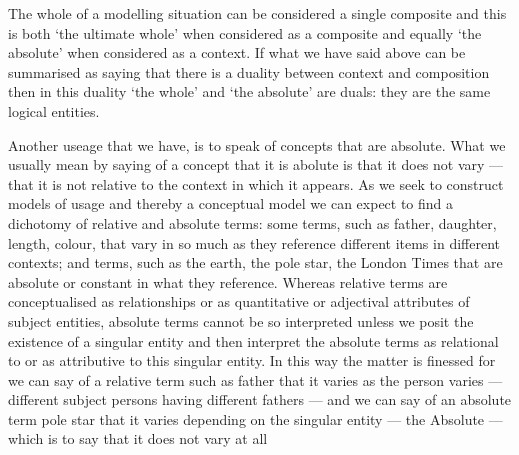 The whole of a modelling situation can be considered a single composite and this is both ‘the ultimate whole’ when considered as a composite and equally ‘the absolute’ when considered as a context. If what we have said above can be summarised as saying that there is a duality between context and composition then in this duality ‘the whole’ and ‘the absolute’ are duals: they are the same logical entities.

Another useage that we have, is to speak of concepts that are absolute. What we usually mean by saying of a concept that it is abolute is that it does not vary — that it is not relative to the context in which it appears. As we seek to construct models of usage and thereby a conceptual model we can expect to find a dichotomy of relative and absolute terms: some terms, such as father, daughter, length, colour, that vary in so much as they reference different items in different contexts; and terms, such as the earth, the pole star, the London Times that are absolute or constant in what they reference. Whereas relative terms are conceptualised as relationships or as quantitative or adjectival attributes of subject entities, absolute terms cannot be so interpreted unless we posit the existence of a singular entity and then interpret the absolute terms as relational to or as attributive to this singular entity. In this way the matter is finessed for we can say of a relative term such as father that it varies as the person varies — different subject persons having different fathers — and we can say of an absolute term pole star that it varies depending on the singular entity — the Absolute — which is to say that it does not vary at all
